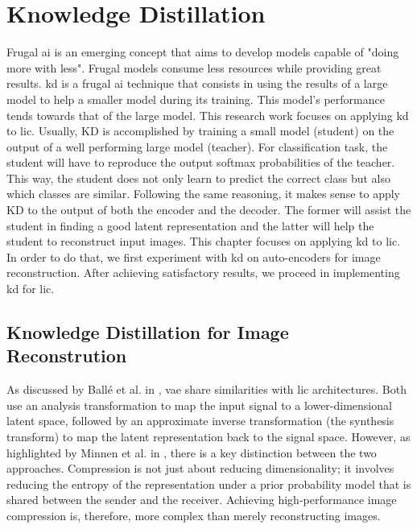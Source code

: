 \chapter{Knowledge Distillation}
\label{part_2}
Frugal \acrshort{ai} is an emerging concept that aims to develop models capable of "doing more with less". Frugal models consume less resources while providing great results. \acrshort{kd} is a frugal \acrshort{ai} technique that consists in using the results of a large model to help a smaller model during its training. This model's performance tends towards that of the large model. This research work focuses on applying \acrshort{kd} to \acrshort{lic}. Usually, KD is accomplished by training a small model (student) on the output of a well performing large model (teacher). For classification task, the student will have to reproduce the output softmax probabilities of the teacher. This way, the student does not only learn to predict the correct class but also which classes are similar. Following the same reasoning, it makes sense to apply KD to the output of both the encoder and the decoder. The former will assist the student in finding a good latent representation and the latter will help the student to reconstruct input images. This chapter focuses on applying \acrshort{kd} to \acrshort{lic}. In order to do that, we first experiment with \acrshort{kd} on auto-encoders for image reconstruction. After achieving satisfactory results, we proceed in implementing \acrshort{kd} for \acrshort{lic}.

\section{Knowledge Distillation for Image Reconstrution}
As discussed by Ballé et al. in \cite{ballé2018variationalimagecompressionscale}, \acrfull{vae} share similarities with \acrshort{lic} architectures. Both use an analysis transformation to map the input signal to a lower-dimensional latent space, followed by an approximate inverse transformation (the synthesis transform) to map the latent representation back to the signal space. However, as highlighted by Minnen et al. in \cite{minnen2018jointautoregressivehierarchicalpriors}, there is a key distinction between the two approaches. Compression is not just about reducing dimensionality; it involves reducing the entropy of the representation under a prior probability model that is shared between the sender and the receiver. Achieving high-performance image compression is, therefore, more complex than merely reconstructing images.

